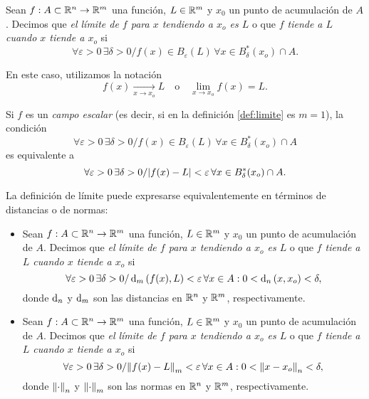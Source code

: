 \label{sec:limites}
\begin{definition} [L\'imite] \label{def:limite}
Sean $f:A \subset \mathbb{R}^n \to \mathbb{R}^m$ una funci\'on, $L \in \mathbb{R}^m$ y $x_0$ un punto de acumulaci\'on de $A$. Decimos que \emph{el l\'imite de $f$ para $x$ tendiendo a $x_o$ es $L$} o que \emph{$f$ tiende a $L$ cuando $x$ tiende a $x_o$}
si
\[
 \forall \varepsilon > 0 \, \exists \delta > 0 / f(x) \in B_{\varepsilon}(L) \, \forall 
 x \in B_{\delta}^*(x_o) \cap A.
\]

En este caso, utilizamos la notaci\'on
\[
 f(x) \xrightarrow[x \to x_o]{} L \quad \text{o} \quad \lim_{x \to x_o} f(x) = L.
\]
\begin{obs} Si $f$ es un \emph{campo escalar} (es decir, si en la definici\'on \eqref{def:limite} es $m = 1$), la condici\'on 
 \[
 \forall \varepsilon > 0 \, \exists \delta > 0 / f(x) \in B_{\varepsilon}(L) \, \forall 
 x \in B_{\delta}^*(x_o) \cap A
\]
es equivalente a 
\[
 \forall \varepsilon > 0 \, \exists \delta > 0 / \abs{ f(x) - L } < \varepsilon \, \forall 
 x \in B_{\delta}^*(x_o) \cap A.
\]
\end{obs}

\begin{obs} La definici\'on de l\'imite puede expresarse equivalentemente en t\'erminos de distancias o de normas:
\begin{itemize} 
 \item Sean $f:A \subset \mathbb{R}^n \to \mathbb{R}^m$ una funci\'on, $L \in \mathbb{R}^m$ y $x_0$ un punto de acumulaci\'on de $A$. Decimos que \emph{el l\'imite de $f$ para $x$ tendiendo a $x_o$ es $L$} o que \emph{$f$ tiende a $L$ cuando $x$ tiende a $x_o$} si
\[
 \forall \varepsilon > 0 \, \exists \delta > 0 / \operatorname{d}_m {(f(x),L)} < \varepsilon \, \forall 
 x\in A : 0 < \operatorname{d}_n {(x,x_o)} < \delta,
\] 
donde $\operatorname{d}_n$ y $\operatorname{d}_m$ son las distancias en $\mathbb{R}^n$ y $\mathbb{R}^m$, respectivamente.

 \item Sean $f:A \subset \mathbb{R}^n \to \mathbb{R}^m$ una funci\'on, $L \in \mathbb{R}^m$ y $x_0$ un punto de acumulaci\'on de $A$. Decimos que \emph{el l\'imite de $f$ para $x$ tendiendo a $x_o$ es $L$} o que \emph{$f$ tiende a $L$ cuando $x$ tiende a $x_o$} si
\[
 \forall \varepsilon > 0 \, \exists \delta > 0 / \norm{f(x) - L}_m < \varepsilon \, \forall 
 x\in A : 0 < \norm{x - x_o}_n < \delta,
\] 
donde $\norm{\cdot}_n$ y $\norm{\cdot}_m$ son las normas en $\mathbb{R}^n$ y $\mathbb{R}^m$, respectivamente.
\end{itemize}
\end{obs}

\end{definition}

